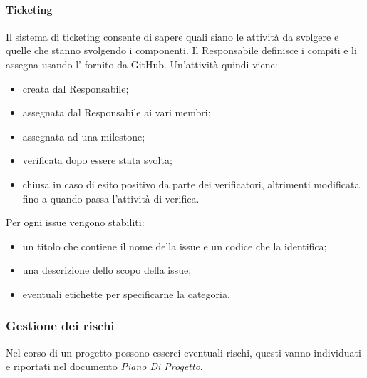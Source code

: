 \paragraph{Ticketing} \hfill \break
Il sistema di ticketing consente di sapere quali siano le attività da svolgere e quelle che stanno svolgendo i componenti.
Il Responsabile definisce i compiti e li assegna usando l' fornito da GitHub. Un'attività quindi viene:
\begin{itemize}
    \item creata dal Responsabile;
    \item assegnata dal Responsabile ai vari membri;
    \item assegnata ad una milestone;
    \item verificata dopo essere stata svolta;
    \item chiusa in caso di esito positivo da parte dei verificatori, altrimenti modificata fino a quando passa l'attività di verifica. 
\end{itemize}
Per ogni issue vengono stabiliti:
\begin{itemize}
    \item un titolo che contiene il nome della issue e un codice che la identifica;
    \item una descrizione dello scopo della issue;
    \item eventuali etichette per specificarne la categoria.
\end{itemize}

\subsubsection{Gestione dei rischi}
Nel corso di un progetto possono esserci eventuali rischi, questi vanno individuati e riportati nel documento \emph{Piano Di Progetto}.

